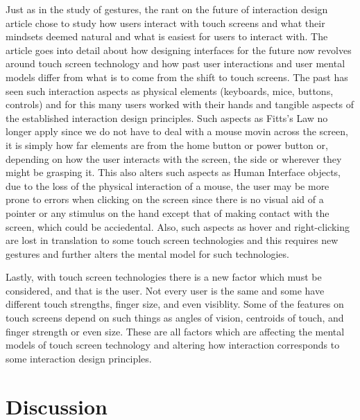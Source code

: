 \documentclass[a4paper]{article}
\begin{document}
     Just as in the study of gestures, the rant on the future of interaction design article chose to study how users interact with touch screens and what their mindsets deemed natural and what is easiest for users to interact with. The article goes into detail about how designing interfaces for the future now revolves around touch screen technology and how past user interactions and user mental models differ from what is to come from the shift to touch screens. The past has seen such interaction aspects as physical elements (keyboards, mice, buttons, controls) and for this many users worked with their hands and tangible aspects of the established interaction design principles. Such aspects as Fitts's Law no longer apply since we do not have to deal with a mouse movin across the screen, it is simply how far elements are from the home button or power button or, depending on how the user interacts with the screen, the side or wherever they might be grasping it. This also alters such aspects as Human Interface objects, due to the loss of the physical interaction of a mouse, the user may be more prone to errors when clicking on the screen since there is no visual aid of a pointer or any stimulus on the hand except that of making contact with the screen, which could be acciedental. Also, such aspects as hover and right-clicking are lost in translation to some touch screen technologies and this requires new gestures and further alters the mental model for such technologies. 
     
     Lastly, with touch screen technologies there is a new factor which must be considered, and that is the user. Not every user is the same and some have different touch strengths, finger size, and even visiblity. Some of the features on touch screens depend on such things as angles of vision, centroids of touch, and finger strength or even size. These are all factors which are affecting the mental models of touch screen technology and altering how interaction corresponds to some interaction design principles. 

\section{Discussion}
\end{document}
